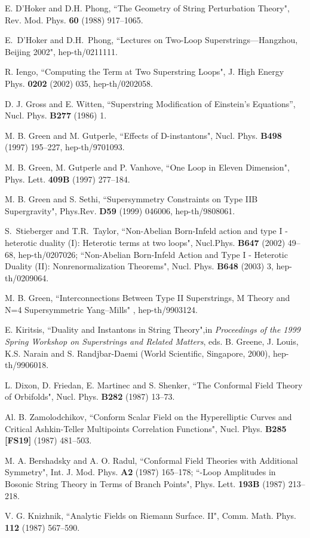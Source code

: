 \documentclass[a4paper,12pt]{article}
\begin{document}
\begin{thebibliography}{[20]}
 E. D'Hoker and D.H. Phong, ``The Geometry of
String Perturbation Theory", Rev. Mod. Phys. {\bf 60} (1988)
917--1065.

 E.~D'Hoker and D.H.~Phong, ``Lectures on
Two-Loop Superstrings---Hangzhou, Beijing 2002",  hep-th/0211111.

 R. Iengo, ``Computing the \coordHE{} Term
at Two Superstring Loops", J. High Energy Phys. {\bf 0202} (2002)
035, hep-th/0202058.

 D. J. Gross and E. Witten, ``Superstring
Modification of Einstein's Equations'', Nucl. Phys. {\bf B277}
(1986) 1.

 M. B. Green and M. Gutperle, ``Effects of
D-instantons", Nucl. Phys.  {\bf B498} (1997) 195--227,
hep-th/9701093.

 M. B. Green, M. Gutperle and P. Vanhove, ``One Loop
in Eleven Dimension", Phys. Lett. {\bf 409B} (1997) 277--184.

 M. B. Green and S. Sethi, ``Supersymmetry
Constraints on Type IIB Supergravity",  Phys.Rev. {\bf D59} (1999)
046006, hep-th/9808061.

 S.~Stieberger and T.R.~Taylor, ``Non-Abelian
Born-Infeld action and type I - heterotic duality  (I): Heterotic
\coordHE{} terms at two loops",  Nucl.Phys. {\bf B647} (2002) 49--68,
hep-th/0207026; ``Non-Abelian Born-Infeld Action and Type I -
Heterotic Duality (II): Nonrenormalization Theorems", Nucl. Phys.
{\bf B648} (2003) 3,  hep-th/0209064.

 M. B. Green, ``Interconnections
Between Type II Superstrings, M Theory and N=4 Supersymmetric
Yang--Mills" , hep-th/9903124.

 E. Kiritsis, ``Duality and Instantons in String
Theory",in {\it Proceedings of the 1999 Spring Workshop on
Superstrings and Related Matters}, eds. B. Greene, J. Louis, K.S.
Narain and S. Randjbar-Daemi (World Scientific, Singapore, 2000),
hep-th/9906018.

 L. Dixon, D. Friedan, E. Martinec and S. Shenker,
``The Conformal Field Theory of Orbifolds", Nucl. Phys. {\bf B282}
(1987) 13--73.

 Al. B. Zamolodchikov, ``Conform Scalar
Field on the Hyperelliptic Curves and Critical Ashkin-Teller
Multipoints Correlation Functions", Nucl. Phys. {\bf B285 [FS19]}
(1987) 481--503.

 M. A. Bershadsky and A. O. Radul, ``Conformal
Field  Theories with Additional \coordHE{} Symmetry", Int. J.
Mod. Phys. {\bf A2} (1987) 165--178; ``\coordHE{}-Loop Amplitudes in
Bosonic String Theory in Terms of Branch Points", Phys. Lett. {\bf
193B} (1987) 213--218.

 V. G. Knizhnik, ``Analytic Fields on Riemann
Surface. II", Comm. Math. Phys. {\bf 112} (1987) 567--590.
\end{thebibliography}
\end{document}

